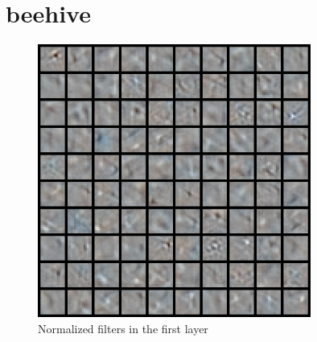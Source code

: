 \documentclass[11pt, oneside]{article}   	%
\begin{document}
\section{beehive}
\begin{figure}[H]
	\centering
	\includegraphics[width=0.8\textwidth]{beehive}
	\caption{Normalized filters in the first layer}
	\label {fig:beehivef}
\end{figure}
\end{document}
